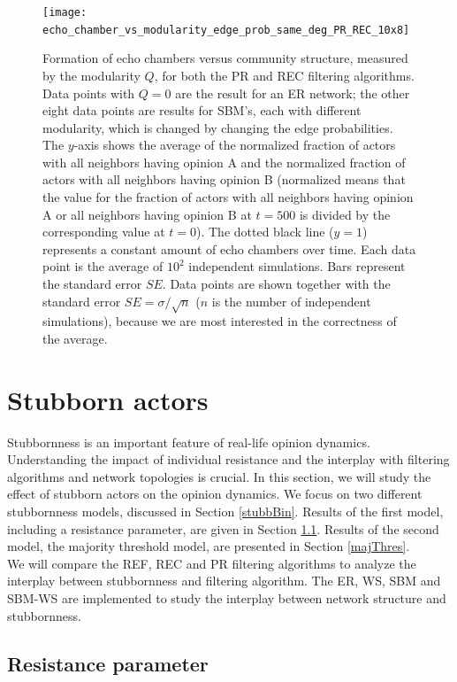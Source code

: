 \documentclass[11 pt , letterpaper , twoside , openright]{book}
\begin{document}
\begin{figure}[H]
	\texttt{[image: echo\_chamber\_vs\_modularity\_edge\_prob\_same\_deg\_PR\_REC\_10x8]}
	\captionsetup{format=plain}
	\caption[Formation of echo chambers versus community structure (modularity $Q$).]{Formation of echo chambers versus community structure, measured by the modularity $Q$, for both the PR and REC filtering algorithms. Data points with $Q = 0$ are the result for an ER network; the other eight data points are results for SBM's, each with different modularity, which is changed by changing the edge probabilities. The $y$-axis shows the average of the normalized fraction of actors with all neighbors having opinion A and the normalized fraction of actors with all neighbors having opinion B  (normalized means that the value for the fraction of actors with all neighbors having opinion A or all neighbors having opinion B at $t=500$ is divided by the corresponding value at $t=0$). The dotted black line ($y=1$) represents a constant amount of echo chambers over time. Each data point is the average of $10^2$ independent simulations. Bars represent the standard error $SE$. Data points are shown together with the standard error $SE = \sigma /\sqrt{n}$ ($n$ is the number of independent simulations), because we are most interested in the correctness of the average.}
\label{echo_vs_mod}
\end{figure}
\noindent
\section{Stubborn actors}

Stubbornness is an important feature of real-life opinion dynamics. Understanding the impact of individual resistance and the interplay with filtering algorithms and network topologies is crucial. In this section, we will study the effect of stubborn actors on the opinion dynamics. We focus on two different stubbornness models, discussed in Section \ref{stubbBin}. Results of the first model, including a resistance parameter, are given in Section \ref{stubbpar}. Results of the second model, the majority threshold model, are presented in Section \ref{majThres}.\\
\newline
We will compare the REF, REC and PR filtering algorithms to analyze the interplay between stubbornness and filtering algorithm. The ER, WS, SBM and SBM-WS are implemented to study the interplay between network structure and stubbornness.
\newpage
\subsection{Resistance parameter}
\label{stubbpar}
\end{document}
